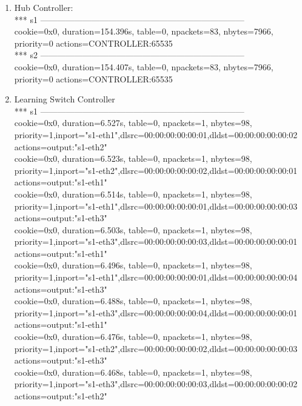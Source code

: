 \documentclass[12pt]{article}
\begin{document}
\begin{enumerate}
    \item Hub Controller: \\
    *** s1 ------------------------------------------------------------------------ \\
    cookie=0x0, duration=154.396s, table=0, npackets=83, nbytes=7966, priority=0 actions=CONTROLLER:65535 \\
    *** s2 ------------------------------------------------------------------------ \\
    cookie=0x0, duration=154.407s, table=0, npackets=83, nbytes=7966, priority=0 actions=CONTROLLER:65535 \\

    \item Learning Switch Controller \\
    *** s1 ------------------------------------------------------------------------ \\
    cookie=0x0, duration=6.527s, table=0, npackets=1, nbytes=98, priority=1,inport="s1-eth1",dlsrc=00:00:00:00:00:01,dldst=00:00:00:00:00:02 actions=output:"s1-eth2" \\
    cookie=0x0, duration=6.523s, table=0, npackets=1, nbytes=98, priority=1,inport="s1-eth2",dlsrc=00:00:00:00:00:02,dldst=00:00:00:00:00:01 actions=output:"s1-eth1" \\
    cookie=0x0, duration=6.514s, table=0, npackets=1, nbytes=98, priority=1,inport="s1-eth1",dlsrc=00:00:00:00:00:01,dldst=00:00:00:00:00:03 actions=output:"s1-eth3" \\
    cookie=0x0, duration=6.503s, table=0, npackets=1, nbytes=98, priority=1,inport="s1-eth3",dlsrc=00:00:00:00:00:03,dldst=00:00:00:00:00:01 actions=output:"s1-eth1" \\
    cookie=0x0, duration=6.496s, table=0, npackets=1, nbytes=98, priority=1,inport="s1-eth1",dlsrc=00:00:00:00:00:01,dldst=00:00:00:00:00:04 actions=output:"s1-eth3" \\
    cookie=0x0, duration=6.488s, table=0, npackets=1, nbytes=98, priority=1,inport="s1-eth3",dlsrc=00:00:00:00:00:04,dldst=00:00:00:00:00:01 actions=output:"s1-eth1" \\
    cookie=0x0, duration=6.476s, table=0, npackets=1, nbytes=98, priority=1,inport="s1-eth2",dlsrc=00:00:00:00:00:02,dldst=00:00:00:00:00:03 actions=output:"s1-eth3" \\
    cookie=0x0, duration=6.468s, table=0, npackets=1, nbytes=98, priority=1,inport="s1-eth3",dlsrc=00:00:00:00:00:03,dldst=00:00:00:00:00:02 actions=output:"s1-eth2" \\

\end{enumerate}
\end{document}
